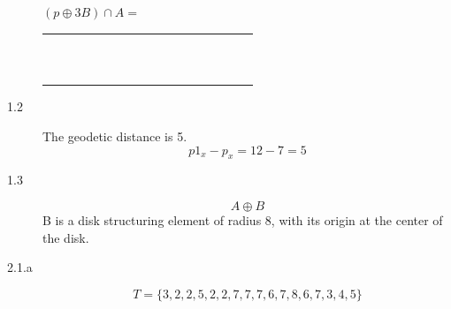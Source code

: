 \documentclass[fleqn]{article}
\begin{document}
\begin{description}
    \begin{math}(p \oplus 3B) \cap A =\end{math}

    \begin{tabular}{| c | c | c | c | c | c | c | c | c | c | c | c | c | c | c | c | c |}
        \hline
        & & & & & & & & & & & & & & & & \\ \hline
        & & & & & & & & & & & & & & & & \\ \hline
        & & & \cellcolor{gray} & \cellcolor{gray} & \cellcolor{gray} & \cellcolor{gray} & \cellcolor{gray} & & & & & & & & & \\ \hline
        & & & \cellcolor{gray} & \cellcolor{gray} & \cellcolor{gray} & \cellcolor{gray} & \cellcolor{gray} & & & & & & & & & \\ \hline
        & & & \cellcolor{gray} & \cellcolor{gray} & \cellcolor{gray} & \cellcolor{gray} & \cellcolor{gray} & & & & & & & & & \\ \hline
        & & & & & \cellcolor{gray} & \cellcolor{gray} & \cellcolor{gray} & \cellcolor{gray} & \cellcolor{gray} & & & & & & & \\ \hline
        & & & \cellcolor{gray} & \cellcolor{gray} & \cellcolor{gray} & \cellcolor{gray} & \cellcolor{gray} & & & & & & & & & \\ \hline
        & & & & & & & & & & & & & & & & \\ \hline
        & & & & & & & & & & & & & & & & \\ \hline
        & & & & & & & & & & & & & & & & \\ \hline
        & & & & & & & & & & & & & & & & \\ \hline
        & & & & & & & & & & & & & & & & \\ \hline
    \end{tabular}

\item [1.2]
    The geodetic distance is 5.
    \begin{displaymath}
        p1_x - p_x = 12 - 7 = 5
    \end{displaymath}

\item [1.3] \begin{equation} A \oplus B \end{equation}
B is a disk structuring element of radius 8, with its origin at the center of
the disk.

\item [2.1.a]
\begin{displaymath}
T = \{ 3, 2, 2, 5, 2, 2 ,7, 7, 7, 6, 7, 8, 6, 7, 3, 4, 5 \}
\end{displaymath}


\end{description}
\end{document}
